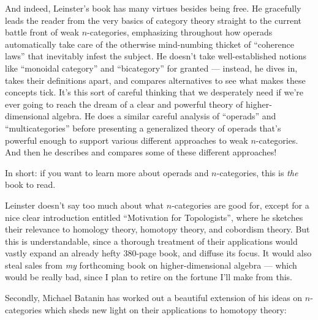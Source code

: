 \documentclass{article}
\renewcommand{\texttt}[1]{%
  \begingroup
  \ttfamily
  \begingroup\lccode`~=`/\lowercase{\endgroup\def~}{/\discretionary{}{}{}}%
  \begingroup\lccode`~=`[\lowercase{\endgroup\def~}{[\discretionary{}{}{}}%
  \begingroup\lccode`~=`.\lowercase{\endgroup\def~}{.\discretionary{}{}{}}%
  \catcode`/=\active\catcode`[=\active\catcode`.=\active
  \scantokens{#1\noexpand}%
  \endgroup
}
\begin{document}
And indeed, Leinster's book has many virtues besides being free. He
gracefully leads the reader from the very basics of category theory
straight to the current battle front of weak \(n\)-categories,
emphasizing throughout how operads automatically take care of the
otherwise mind-numbing thicket of ``coherence laws'' that inevitably
infest the subject. He doesn't take well-established notions like
``monoidal category'' and ``bicategory'' for granted --- instead, he
dives in, takes their definitions apart, and compares alternatives to
see what makes these concepts tick. It's this sort of careful thinking
that we desperately need if we're ever going to reach the dream of a
clear and powerful theory of higher-dimensional algebra. He does a
similar careful analysis of ``operads'' and ``multicategories'' before
presenting a generalized theory of operads that's powerful enough to
support various different approaches to weak \(n\)-categories. And then
he describes and compares some of these different approaches!

In short: if you want to learn more about operads and \(n\)-categories,
this is \emph{the} book to read.

Leinster doesn't say too much about what \(n\)-categories are good for,
except for a nice clear introduction entitled ``Motivation for
Topologists'', where he sketches their relevance to homology theory,
homotopy theory, and cobordism theory. But this is understandable, since
a thorough treatment of their applications would vastly expand an
already hefty 380-page book, and diffuse its focus. It would also steal
sales from \emph{my} forthcoming book on higher-dimensional algebra ---
which would be really bad, since I plan to retire on the fortune I'll
make from this.

Secondly, Michael Batanin has worked out a beautiful extension of his
ideas on \(n\)-categories which sheds new light on their applications to
homotopy theory:

\end{document}
